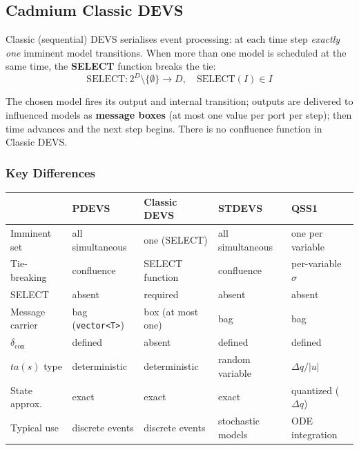 \subsection*{Cadmium Classic DEVS}

Classic (sequential) DEVS serialises event processing: at each time step
\emph{exactly one} imminent model transitions.  When more than one model
is scheduled at the same time, the \textbf{SELECT} function breaks the
tie:
\[
  \text{SELECT} : 2^D \setminus \{\emptyset\} \to D,\quad
  \text{SELECT}(I) \in I
\]

The chosen model fires its output and internal transition; outputs are
delivered to influenced models as \textbf{message boxes} (at most one
value per port per step); then time advances and the next step begins.
There is no confluence function in Classic DEVS.

\subsubsection*{Key Differences}

{\small
\begin{center}
\begin{tabular}{@{}lllll@{}}
  \toprule
  & PDEVS & Classic DEVS & STDEVS & QSS1 \\
  \midrule
  Imminent set          & all simultaneous & one (SELECT)    & all simultaneous & one per variable \\
  Tie-breaking          & confluence       & SELECT function & confluence       & per-variable $\sigma$ \\
  SELECT                & absent           & required        & absent           & absent \\
  Message carrier       & bag (\texttt{vector<T>}) & box (at most one) & bag & bag \\
  $\delta_{\text{con}}$ & defined          & absent          & defined          & defined \\
  $ta(s)$ type          & deterministic    & deterministic   & random variable  & $\Delta q/|u|$ \\
  State approx.         & exact            & exact           & exact            & quantized ($\Delta q$) \\
  Typical use           & discrete events  & discrete events & stochastic models & ODE integration \\
  \bottomrule
\end{tabular}
\end{center}}

